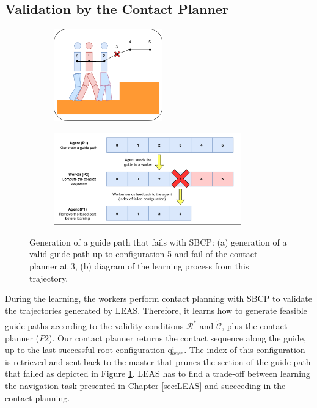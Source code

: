 \subsection{Validation by the Contact Planner}
\begin{figure}[ht]
    \captionsetup[subfigure]{justification=centering}
    \centering
    \begin{subfigure}[t]{.35\linewidth}
    \includegraphics[width=\textwidth, height=4cm]{Figures/Chapter_CPSB/example_fail_planning.png}
    \caption{}
    \end{subfigure}
    \begin{subfigure}[t]{.60\linewidth}
    \includegraphics[width=\textwidth, height=4cm]{Figures/Chapter_CPSB/example_fail_planning_diagram.png}
    \caption{}
    \end{subfigure}
    \caption{Generation of a guide path that fails with SBCP: (a) generation of a valid guide path up to configuration 5 and fail of the contact planner at 3, (b) diagram of the learning process from this trajectory.}
    \label{fig:cp-sb:remove_fail_path}
\end{figure}
During the learning, the workers perform contact planning with SBCP to validate the trajectories generated by LEAS. Therefore, it learns how to generate feasible guide paths according to the validity conditions $\tilde{\mathcal{R}^*}$ and $\tilde{\mathcal{C}}$, plus the contact planner ($P2$).
Our contact planner returns the contact sequence along the guide, up to the last successful root configuration q$_{base}^i$.
The index of this configuration is retrieved and sent back to the master that prunes the section of the guide path that failed as depicted in Figure \ref{fig:cp-sb:remove_fail_path}.
LEAS has to find a trade-off between learning the navigation task presented in Chapter \ref{sec:LEAS} and succeeding in the contact planning.

